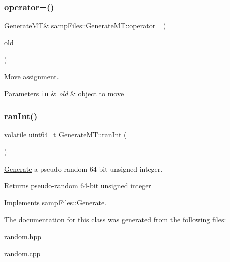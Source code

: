 \subsubsection{\texorpdfstring{operator=()}{operator=()}\hspace{0.1cm}{\footnotesize\ttfamily [2/2]}}
{\footnotesize\ttfamily \hyperlink{classsamp_files_1_1_generate_m_t}{Generate\+MT}\& samp\+Files\+::\+Generate\+M\+T\+::operator= (\begin{DoxyParamCaption}\item[{\hyperlink{classsamp_files_1_1_generate_m_t}{Generate\+MT} \&\&}]{old }\end{DoxyParamCaption})\hspace{0.3cm}{\ttfamily [default]}}



Move assignment. 


\begin{DoxyParams}[1]{Parameters}
\mbox{\tt in}  & {\em old} & object to move \\
\hline
\end{DoxyParams}
\mbox{\label{classsamp_files_1_1_generate_m_t_a500e163265b6fdae0a30fdacc1c37f80}} 
\subsubsection{\texorpdfstring{ran\+Int()}{ranInt()}}
{\footnotesize\ttfamily volatile uint64\+\_\+t Generate\+M\+T\+::ran\+Int (\begin{DoxyParamCaption}{ }\end{DoxyParamCaption})\hspace{0.3cm}{\ttfamily [virtual]}}



\hyperlink{classsamp_files_1_1_generate}{Generate} a pseudo-\/random 64-\/bit unsigned integer. 

\begin{DoxyReturn}{Returns}
pseudo-\/random 64-\/bit unsigned integer 
\end{DoxyReturn}


Implements \hyperlink{classsamp_files_1_1_generate_a86fe4e68cc0809d4d936615fc60c125e}{samp\+Files\+::\+Generate}.



The documentation for this class was generated from the following files\+:\begin{DoxyCompactItemize}
\item 
\hyperlink{random_8hpp}{random.\+hpp}\item 
\hyperlink{random_8cpp}{random.\+cpp}\end{DoxyCompactItemize}
